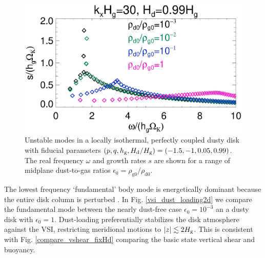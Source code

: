 \begin{figure}
  \includegraphics[width=\linewidth]{figures/compare_eigenvals_kx30Hd1} 
  \caption{Unstable modes in a locally isothermal, perfectly coupled
    dusty disk with fiducial parameters
    $(p,q,h_\mathrm{g}, H_\mathrm{d}/H_\mathrm{g} )=(-1.5,-1,0.05, 0.99)$. The real
    frequency $\omega$ and growth rates $s$ are shown for a range of
    midplane dust-to-gas ratios $\epsilon_0=\rho_\mathrm{g0}/\rho_\mathrm{d0}$. 
    \label{vsi_dust_loading}
    }
\end{figure}

The lowest frequency `fundamental' body mode is energetically dominant
because the entire disk column is perturbed \citep[cf. surface modes
  which only disturb the disk boundaries,][]{umurhan16c}. In Fig. \ref{vsi_dust_loading2d}
we compare the fundamental mode between the nearly 
dust-free case $\epsilon_0=10^{-3}$ an a dusty disk with
$\epsilon_0=1$. Dust-loading preferentially
stabilizes the disk atmosphere against the VSI, restricting
meridional motions to $|z|\lesssim 2H_\mathrm{g}$. 
This is consistent with Fig. \ref{compare_vshear_fixHd} comparing the basic state vertical
shear and buoyancy. %

